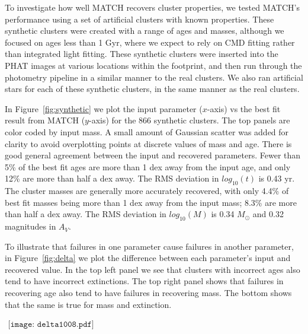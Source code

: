 \documentclass{emulateapj}
\begin{document}
To investigate how well MATCH recovers cluster properties, we tested MATCH's performance using a set of artificial clusters with known properties.  These synthetic clusters were created with a range of ages and masses, although we focused on ages less than 1 Gyr, where we expect to rely on CMD fitting rather than integrated light fitting.  These synthetic clusters were inserted into the PHAT images at various locations within the footprint, and then run through the photometry pipeline in a similar manner to the real clusters.  We also ran artificial stars for each of these synthetic clusters, in the same manner as the real clusters.

In Figure~\ref{fig:synthetic} we plot the input parameter ($x$-axis) vs the best fit result from MATCH ($y$-axis) for the 866 synthetic clusters.  The top panels are color coded by input mass.  A small amount of Gaussian scatter was added for clarity to avoid overplotting points at discrete values of mass and age.  There is good general agreement between the input and recovered parameters.  Fewer than 5\% of the best fit ages are more than 1 dex away from the input age, and only 12\% are more than half a dex away.  The RMS deviation in $log_{10} (t)$ is 0.43 yr.  The cluster masses are generally more accurately recovered, with only 4.4\% of best fit masses being more than 1 dex away from the input mass; 8.3\% are more than half a dex away.  The RMS deviation in $log_{10} (M)$ is 0.34 $M_{\odot}$ and 0.32 magnitudes in $A_{V}$.

To illustrate that failures in one parameter cause failures in another parameter, in Figure~\ref{fig:delta} we plot the difference between each parameter's input and recovered value.  In the top left panel we see that clusters with incorrect ages also tend to have incorrect extinctions.  The top right panel shows that failures in recovering age also tend to have failures in recovering mass.  The bottom shows that the same is true for mass and extinction.


\begin{figure*}[!htbp]
   \begin{center}$
     \begin{array}{cc}
        \texttt{[image: delta1008.pdf]} 
    \end{array}$
 \end{center}
\caption{The difference in input and recovered $log_{10} (t)$ versus the difference in input and recovered $log_{10} (M)$ for synthetic clusters (left panel).  The difference in input and recovered $log_{10} (t)$ versus the difference in input and recovered $A_{V}$ for synthetic clusters (middle panel).  The right panel shows the difference in input and recovered $log_{10} (M)$ versus the difference in input and recovered $A_{V}$.  It is clear that failures in one parameter correlate with failures in the other parameters.}
\label{fig:delta}
\end{figure*}
\end{document}
